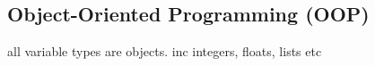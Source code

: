 
\subsection{Object-Oriented Programming (OOP)}

all variable types are objects. inc integers, floats, lists etc

